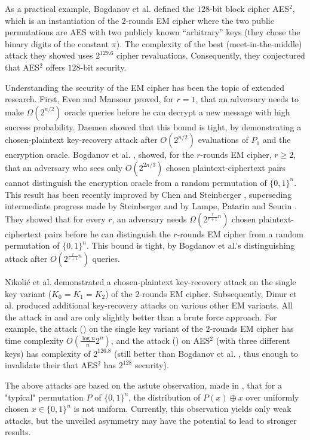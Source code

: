 \documentclass{llncs}
\newcommand{\s}{\{0,1\}}
\begin{document}
As a practical example, Bogdanov et al. defined the $128$-bit block cipher AES$^2$, which is an instantiation of the $2$-rounds EM cipher where the two public permutations are AES with two publicly known ``arbitrary'' keys (they chose the binary digits of the constant $\pi$). The complexity of the best (meet-in-the-middle) attack they showed uses $2^{129.6}$ cipher revaluations. Consequently, they conjectured that AES$^2$ offers $128$-bit security.

Understanding the security of the EM cipher has been the topic of extended research. 
First, Even and Mansour \cite{EM} proved, for $r=1$, that an adversary needs to make $\Omega(2^{n/2})$ oracle queries before he can decrypt a new message with high success probability. 
Daemen \cite{Daemen} showed that this bound is tight, by demonstrating a chosen-plaintext key-recovery attack after $O(2^{n/2})$ evaluations of $P_1$ and the encryption oracle.
Bogdanov et al. \cite{BKLSST}, showed, for the $r$-rounds EM cipher, $r\ge2$, that an adversary who sees only $O(2^{2n/3})$ chosen plaintext-ciphertext pairs cannot distinguish the encryption oracle from a random permutation of $\{0, 1\}^n$.
This result has been recently improved by Chen and Steinberger \cite{CS}, superseding intermediate progress made by Steinberger \cite{Steinberger} and by Lampe, Patarin and Seurin \cite{LPS}. They showed that for every $r$, an adversary needs $\Omega(2^{\frac{r}{r+1}n})$ chosen plaintext-ciphertext pairs before he can distinguish the $r$-rounds EM cipher from a random permutation of $\{0, 1\}^n$. This bound is tight, by Bogdanov et al.'s \cite{BKLSST} distinguishing attack after $O(2^{\frac{r}{r+1}n})$ queries.

Nikoli{\'c} et al. \cite{NWW} demonstrated a chosen-plaintext key-recovery attack on the single key variant ($K_0=K_1=K_2$) of the $2$-rounds EM cipher. Subsequently, Dinur et al. \cite{DDKS} produced additional key-recovery attacks on various other EM variants. 
All the attack in \cite{NWW} and \cite{DDKS} are only slightly better than a brute force approach. For example, the attack (\cite{DDKS}) on the single key variant of the $2$-rounds EM cipher has time complexity $O\left(\frac{\log n}{n}2^n\right)$, and the attack (\cite{DDKS}) on AES$^2$ (with three different keys) has complexity of $2^{126.8}$ 
(still better than Bogdanov et al. \cite{BKLSST}, thus enough to invalidate their that AES$^2$ has $2^{128}$ security). 

The above attacks are based on the astute observation, made in \cite{NWW}, that for a "typical" permutation $P$ of $\s^n$, the distribution of $P(x)\oplus x$ over uniformly chosen $x\in\s^n$ is not uniform. Currently, this observation yields only weak attacks, but the unveiled asymmetry may have the potential to lead to stronger results. 
\end{document}

